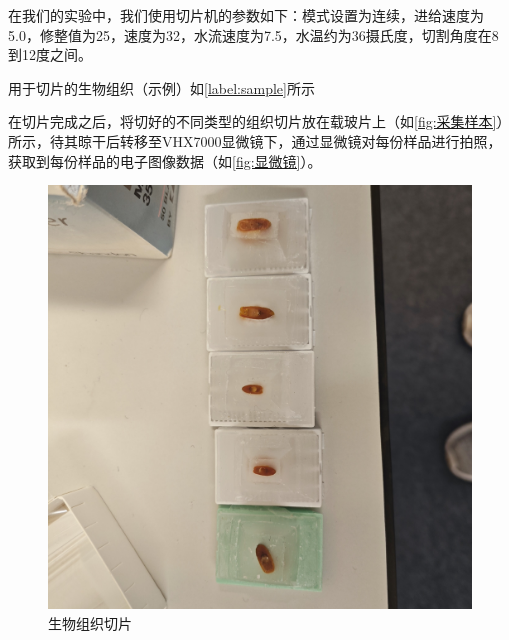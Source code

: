 
在我们的实验中，我们使用切片机的参数如下：模式设置为连续，进给速度为5.0，修整值为25，速度为32，水流速度为7.5，水温约为36摄氏度，切割角度在8到12度之间。

用于切片的生物组织（示例）如\autoref{label:sample}所示

在切片完成之后，将切好的不同类型的组织切片放在载玻片上（如\autoref{fig:采集样本}）所示，待其晾干后转移至VHX7000显微镜下，通过显微镜对每份样品进行拍照，获取到每份样品的电子图像数据（如\autoref{fig:显微镜}）。

\begin{figure}[htbp]
    \centering
    \begin{minipage}{0.3\textwidth}
        \centering
        \includegraphics[width=\textwidth]{./fig/sample.jpg}
        \caption{生物组织切片}
        \label{label:sample}
    \end{minipage}
    \begin{minipage}{0.3\textwidth}
        \centering

\end{minipage}
\end{figure}
